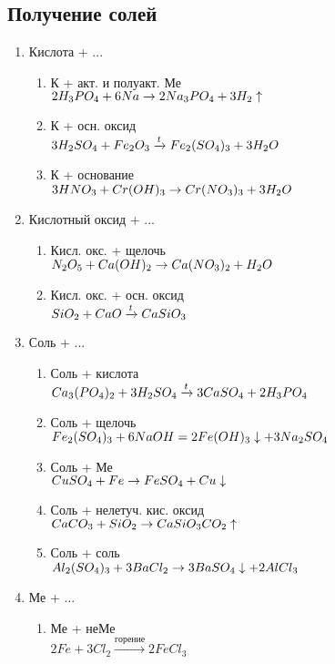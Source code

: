 \subsection{Получение солей}
\begin{enumerate}
    \item Кислота + ...
    \begin{enumerate}
        \item К + акт. и полуакт. Ме\\
            $2H_3PO_4 + 6Na \rightarrow 2Na_3PO_4 + 3H_2\uparrow$

        \item К + осн. оксид\\
            $3H_2SO_4 + Fe_2O_3 \xrightarrow{t} Fe_2(SO_4)_3 + 3H_2O$

        \item К + основание\\
            $3HNO_3 + Cr(OH)_3 \rightarrow Cr(NO_3)_3 + 3H_2O$
    \end{enumerate}

    \item Кислотный оксид + ...
    \begin{enumerate}
        \item Кисл. окс. + щелочь\\
            $N_2O_5 + Ca(OH)_2 \rightarrow Ca(NO_3)_2 + H_2O$

        \item Кисл. окс. + осн. оксид\\
            $SiO_2 + CaO \xrightarrow{t} CaSiO_3$
    \end{enumerate}

    \item Соль + ...
    \begin{enumerate}
        \item Соль + кислота\\
            $Ca_3(PO_4)_2 + 3H_2SO_4 \xrightarrow{t} 3CaSO_4 + 2H_3PO_4$

        \item Соль + щелочь\\
            $Fe_2(SO_4)_3 + 6NaOH = 2Fe(OH)_3\downarrow + 3Na_2SO_4$

        \item Соль + Ме\\
            $CuSO_4 + Fe \rightarrow FeSO_4 + Cu\downarrow$

        \item Соль + нелетуч. кис. оксид\\
            $CaCO_3 + SiO_2 \rightarrow CaSiO_3 CO_2\uparrow$

        \item Соль + соль\\
            $Al_2(SO_4)_3 + 3BaCl_2 \rightarrow 3BaSO_4\downarrow + 2AlCl_3$
    \end{enumerate}

    \item Ме + ...
    \begin{enumerate}
        \item Ме + неМе\\
            $2Fe + 3Cl_2 \xrightarrow{горение} 2FeCl_3$
    \end{enumerate}

\end{enumerate}


